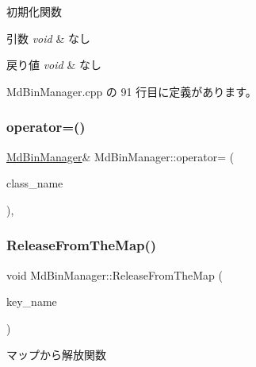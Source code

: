 初期化関数 


\begin{DoxyParams}{引数}
{\em void} & なし \\
\hline
\end{DoxyParams}

\begin{DoxyRetVals}{戻り値}
{\em void} & なし \\
\hline
\end{DoxyRetVals}


 Md\+Bin\+Manager.\+cpp の 91 行目に定義があります。

\mbox{\label{class_md_bin_manager_a17b8525afa9637fb07506178f1b01d9c}} 
\subsubsection{\texorpdfstring{operator=()}{operator=()}}
{\footnotesize\ttfamily \mbox{\hyperlink{class_md_bin_manager}{Md\+Bin\+Manager}}\& Md\+Bin\+Manager\+::operator= (\begin{DoxyParamCaption}\item[{const \mbox{\hyperlink{class_md_bin_manager}{Md\+Bin\+Manager}} \&}]{class\+\_\+name }\end{DoxyParamCaption})\hspace{0.3cm}{\ttfamily [private]}, {\ttfamily [delete]}}

\mbox{\label{class_md_bin_manager_a25cec221e76357ed3f0243a614fd1b0e}} 
\subsubsection{\texorpdfstring{Release\+From\+The\+Map()}{ReleaseFromTheMap()}}
{\footnotesize\ttfamily void Md\+Bin\+Manager\+::\+Release\+From\+The\+Map (\begin{DoxyParamCaption}\item[{std\+::string $\ast$}]{key\+\_\+name }\end{DoxyParamCaption})}



マップから解放関数 



